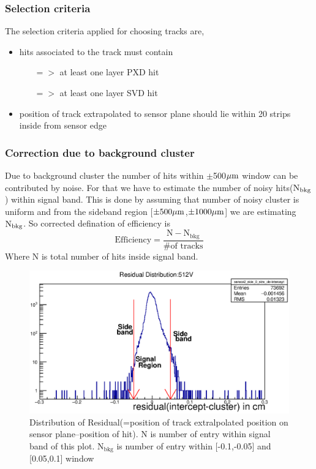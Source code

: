 \documentclass[12pt]{article}
\begin{document}
	 \subsubsection{Selection criteria} The selection criteria applied for choosing tracks are,
	 \begin{itemize}
	 	\item  hits associated to the track must contain
	 	\begin{itemize}
	 		\item[$=>$] at least one layer PXD hit
	 		\item[$=>$] at least one layer SVD hit
	 	\end{itemize}
	 	\item position of track extrapolated to sensor plane should lie within 20 strips inside from sensor edge
	 \end{itemize}
	 \subsubsection{Correction due to background cluster}
	 \begin{multicols}{2}
	 	 Due to background cluster the number of hits within $\pm$500$\mu \rm{m}$ window can be contributed by noise. For that we have to estimate the number of noisy hits($\rm{N}_{\rm{bkg}}$) within signal band. This is done by assuming that number of noisy cluster is uniform and from the sideband region [$\pm500 \mu \rm{m}$,$\pm1000 \mu \rm{m}$] we are estimating $\rm{N}_{\rm{bkg}}$. So corrected defination of efficiency is $$\text{Efficiency}=\frac{\text{N}-\text{N}_{\text{bkg}}}{\text{\# of tracks}}$$
	 	 Where N is total number of hits inside signal band.
	 	 	\begin{figure}[H]
	 	 		\includegraphics[width=.5\textwidth]{nbkg.eps}	
	 	 		\caption{Distribution of Residual(=position of track extralpolated position on sensor plane--position of hit). N is number of entry within signal band of this plot. $\text{N}_{\text{bkg}}$ is number of entry within [-0.1,-0.05] and [0.05,0.1] window}	
	 	 		\label{fig1}	
	 	 	\end{figure}
	 	\end{multicols}
	 
\end{document}
